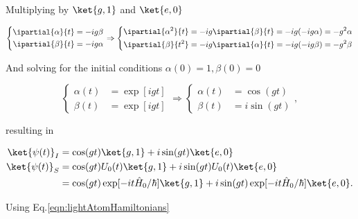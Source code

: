 \noindent Multiplying by $\ket{g,1}$ and $\ket{e,0}$

\begin{equation}
  \left\lbrace
    \begin{aligned}
      \ipartial{\alpha}{t} & = -ig\beta\\
      \ipartial{\beta}{t} & = -ig\alpha\\
    \end{aligned}\right.
  \Rightarrow \left\lbrace
    \begin{aligned}
      \ipartial{\alpha^2}{t} & = -ig\ipartial{\beta}{t} = -ig(-ig\alpha)=-g^2\alpha\\
      \ipartial{\beta}{t^2} & = -ig\ipartial{\alpha}{t} = -ig(-ig\beta)=-g^2\beta\\
    \end{aligned}\right.
\end{equation}

\noindent     And     solving     for     the     initial     conditions
$\alpha(0) = 1, \beta(0) = 0$

\begin{equation}
  \left\lbrace
    \begin{aligned}
      \alpha(t) & = \exp[igt]\\
      \beta(t) & = \exp[igt]
    \end{aligned}\right.
  \Rightarrow
  \left\lbrace
    \begin{aligned}
      \alpha(t) & = \cos(gt)\\
      \beta(t) & = i\sin(gt)
    \end{aligned}\right.,
\end{equation}

\noindent resulting in

\begin{equation}
  \begin{aligned}
    \ket{\psi(t)}_I & = \cos(gt)\ket{g,1}+i\sin(gt)\ket{e,0}\\
    \ket{\psi(t)}_S & = \cos(gt)U_0(t)\ket{g,1}+i\sin(gt)U_0(t)\ket{e,0}\\
    &  =   \cos(gt)\exp[-it  \hat{H}_0/\hbar]\ket{g,1}+i\sin(gt)\exp[-it
    \hat{H}_0/\hbar]\ket{e,0}.
  \end{aligned}
\end{equation}

\noindent Using Eq.\eqref{eqn:lightAtomHamiltonians}

